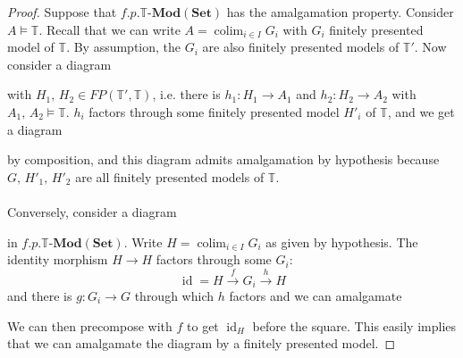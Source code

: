\documentclass[10pt,a4paper]{amsart}
\newcommand{\Mod}{{\mathbf{Mod}}}
\newcommand{\Set}{\mathbf{Set}}
\newcommand{\T}{\mathbb{T}}
\newcommand{\colim}{\operatorname{colim}}
\newcommand{\id}{\operatorname{id}}
\begin{document}
\begin{proof}
    Suppose that $f.p.\T$-$\Mod(\Set)$ has the amalgamation property. Consider $A\models\T$. Recall that we can write $A=\colim_{i\in I}G_i$ with $G_i$ finitely presented model of $\T$. By assumption, the $G_i$ are also finitely presented models of $\T'$. Now consider a diagram  
    \begin{center}
    \end{center}
    with $H_1,\, H_2\in FP(\T',\T)$, i.e. there is $h_1:H_1\xrightarrow{}A_1$ and $h_2:H_2\xrightarrow{}A_2$ with $A_1,\,A_2\models\T$. $h_i$ factors through some finitely presented model $H'_i$ of $\T$, and we get a diagram 
     \begin{center}
    \end{center}
    by composition, and this diagram admits amalgamation by hypothesis because $G,\,H'_1,\,H'_2$ are all finitely presented models of $\T$.\\
    \\
    Conversely, consider a diagram 
     \begin{center}
    \end{center}
    in $f.p.\T$-$\Mod(\Set)$. Write $H=\colim_{i\in I}G_i$ as given by hypothesis. The identity morphism $H\xrightarrow{}H$ factors through some $G_i$:
    $$\id=H\xrightarrow{f}G_i\xrightarrow{h}H$$
    and there is $g:G_i\xrightarrow{}G$ through which $h$ factors and we can amalgamate
    \begin{center}
    \end{center}
    We can then precompose with $f$ to get $\id_H$ before the square. This easily implies that we can amalgamate the diagram by a finitely presented model.
\end{proof}
\end{document}
